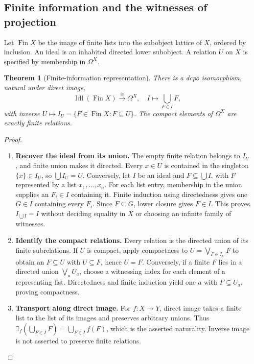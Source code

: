 \documentclass[11pt,a4paper]{article}
\newtheorem{theorem}{Theorem}[section]
\theoremstyle{definition}
\theoremstyle{remark}\newaliascnt{remark}{theorem}
\newcommand{\Fin}{\operatorname{Fin}}
\newcommand{\Idl}{\operatorname{Idl}}
\numberwithin{equation}{section}
\begin{document}
\subsection{Finite information and the witnesses of projection}
Let \(\Fin X\) be the image of finite lists into the subobject lattice of \(X\), ordered by inclusion. An ideal is an inhabited directed lower subobject. A relation \(U\) on \(X\) is specified by membership in \(\Omega^X\).
\begin{theorem}[Finite-information representation]\label{thm:finite-relations}
There is a dcpo isomorphism, natural under direct image,
\begin{equation}\label{eq:relations-ideals}
 \Idl(\Fin X)\xrightarrow{\cong}\Omega^X,
 \quad I\longmapsto\bigcup_{F\in I}F,
\end{equation}
with inverse $U\mapsto I_U=\{F\in\Fin X:F\subseteq U\}$. The compact elements of $\Omega^X$ are exactly finite relations.
\end{theorem}
\begin{proof}\leavevmode
\begin{enumerate}[titledsteps]
    \item \textbf{Recover the ideal from its union.} The empty finite relation belongs to $I_U$, and finite union makes it directed. Every $x\in U$ is contained in the singleton $\{x\}\in I_U$, so $\bigcup I_U=U$. Conversely, let $I$ be an ideal and $F\subseteq\bigcup I$, with $F$ represented by a list $x_1,\dots,x_n$. For each list entry, membership in the union supplies an $F_i\in I$ containing it. Finite induction using directedness gives one $G\in I$ containing every $F_i$. Since $F\subseteq G$, lower closure gives $F\in I$. This proves $I_{\bigcup I}=I$ without deciding equality in $X$ or choosing an infinite family of witnesses.


    \item \textbf{Identify the compact relations.} Every relation is the directed union of its finite subrelations. If $U$ is compact, apply compactness to $U=\bigvee_{F\in I_U}F$ to obtain an $F\subseteq U$ with $U\subseteq F$, hence $U=F$. Conversely, if a finite $F$ lies in a directed union $\bigvee_aU_a$, choose a witnessing index for each element of a representing list. Directedness and finite induction yield one $a$ with $F\subseteq U_a$, proving compactness.


    \item \textbf{Transport along direct image.} For $f:X\to Y$, direct image takes a finite list to the list of its images and preserves arbitrary unions. Thus $\exists_f(\bigcup_{F\in I}F)=\bigcup_{F\in I}f(F)$, which is the asserted naturality. Inverse image is not asserted to preserve finite relations.\qedhere
\end{enumerate}
\end{proof}
\end{document}
